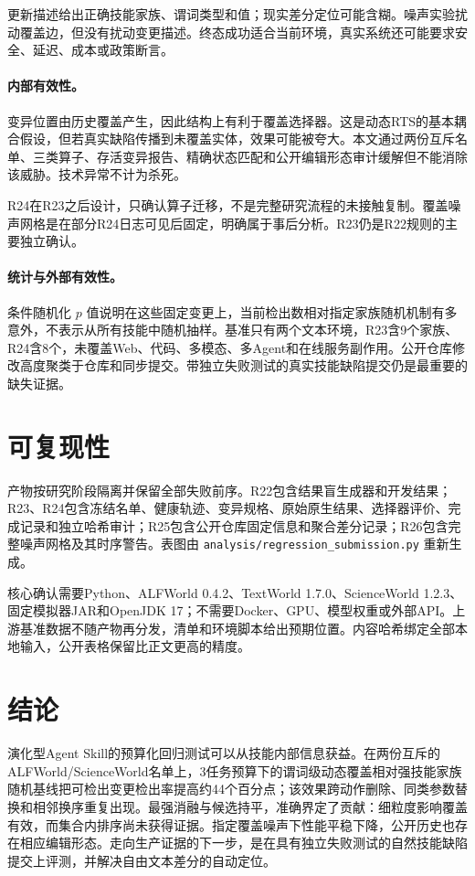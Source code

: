 \documentclass[10pt]{article}
\begin{document}
更新描述给出正确技能家族、谓词类型和值；现实差分定位可能含糊。噪声实验扰动覆盖边，但没有扰动变更描述。终态成功适合当前环境，真实系统还可能要求安全、延迟、成本或政策断言。

\paragraph{内部有效性。}
变异位置由历史覆盖产生，因此结构上有利于覆盖选择器。这是动态RTS的基本耦合假设，但若真实缺陷传播到未覆盖实体，效果可能被夸大。本文通过两份互斥名单、三类算子、存活变异报告、精确状态匹配和公开编辑形态审计缓解但不能消除该威胁。技术异常不计为杀死。

R24在R23之后设计，只确认算子迁移，不是完整研究流程的未接触复制。覆盖噪声网格是在部分R24日志可见后固定，明确属于事后分析。R23仍是R22规则的主要独立确认。

\paragraph{统计与外部有效性。}
条件随机化 $p$ 值说明在这些固定变更上，当前检出数相对指定家族随机机制有多意外，不表示从所有技能中随机抽样。基准只有两个文本环境，R23含9个家族、R24含8个，未覆盖Web、代码、多模态、多Agent和在线服务副作用。公开仓库修改高度聚类于仓库和同步提交。带独立失败测试的真实技能缺陷提交仍是最重要的缺失证据。

\section{可复现性}
产物按研究阶段隔离并保留全部失败前序。R22包含结果盲生成器和开发结果；R23、R24包含冻结名单、健康轨迹、变异规格、原始原生结果、选择器评价、完成记录和独立哈希审计；R25包含公开仓库固定信息和聚合差分记录；R26包含完整噪声网格及其时序警告。表图由 \texttt{analysis/regression\_submission.py} 重新生成。

核心确认需要Python、ALFWorld 0.4.2、TextWorld 1.7.0、ScienceWorld 1.2.3、固定模拟器JAR和OpenJDK 17；不需要Docker、GPU、模型权重或外部API。上游基准数据不随产物再分发，清单和环境脚本给出预期位置。内容哈希绑定全部本地输入，公开表格保留比正文更高的精度。

\section{结论}
演化型Agent Skill的预算化回归测试可以从技能内部信息获益。在两份互斥的ALFWorld/ScienceWorld名单上，3任务预算下的谓词级动态覆盖相对强技能家族随机基线把可检出变更检出率提高约44个百分点；该效果跨动作删除、同类参数替换和相邻换序重复出现。最强消融与候选持平，准确界定了贡献：细粒度影响覆盖有效，而集合内排序尚未获得证据。指定覆盖噪声下性能平稳下降，公开历史也存在相应编辑形态。走向生产证据的下一步，是在具有独立失败测试的自然技能缺陷提交上评测，并解决自由文本差分的自动定位。
\end{document}
